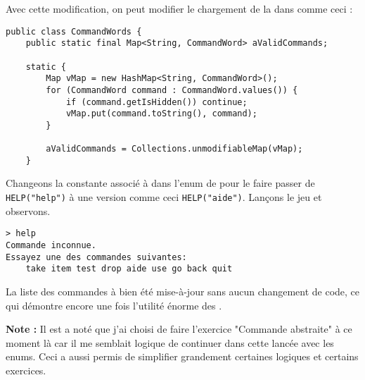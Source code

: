 \begin{exercise}[subtitle=enum/look]
\begin{verbatim}
\end{verbatim}

Avec cette modification, on peut modifier le chargement de la  dans  comme ceci :

\begin{verbatim}
public class CommandWords {
    public static final Map<String, CommandWord> aValidCommands;

    static {
        Map vMap = new HashMap<String, CommandWord>();
        for (CommandWord command : CommandWord.values()) {
            if (command.getIsHidden()) continue;
            vMap.put(command.toString(), command);
        }

        aValidCommands = Collections.unmodifiableMap(vMap);
    }
\end{verbatim}
\end{exercise}

\begin{exercise}[subtitle=enum/help]

Changeons la constante associé à  dans l'enum de  pour le faire passer de \texttt{HELP("help")} à une version comme ceci \texttt{HELP("aide")}. Lançons le jeu et observons.

\begin{verbatim}
> help
Commande inconnue.
Essayez une des commandes suivantes:
	take item test drop aide use go back quit
\end{verbatim}

La liste des commandes à bien été mise-à-jour sans aucun changement de code, ce qui démontre encore une fois l'utilité énorme des .

\textbf{Note :} Il est a noté que j'ai choisi de faire l'exercice "Commande abstraite" à ce moment là car il me semblait logique de continuer dans cette lancée avec les enums. Ceci a aussi permis de simplifier grandement certaines logiques et certains exercices.

\end{exercise}


